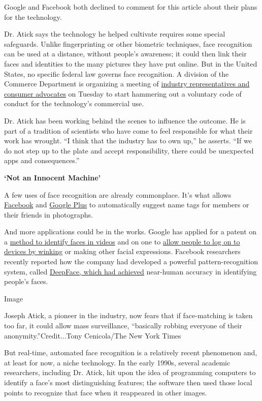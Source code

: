 Google and Facebook both declined to comment for this article about
their plans for the technology.

Dr. Atick says the technology he helped cultivate requires some special
safeguards. Unlike fingerprinting or other biometric techniques, face
recognition can be used at a distance, without people's awareness; it
could then link their faces and identities to the many pictures they
have put online. But in the United States, no specific federal law
governs face recognition. A division of the Commerce Department is
organizing a meeting of
\href{http://www.nytimes3xbfgragh.onion/2014/02/02/technology/when-no-one-is-just-a-face-in-the-crowd.html}{industry
representatives and consumer advocates} on Tuesday to start hammering
out a voluntary code of conduct for the technology's commercial use.

Dr. Atick has been working behind the scenes to influence the outcome.
He is part of a tradition of scientists who have come to feel
responsible for what their work has wrought. ``I think that the industry
has to own up,'' he asserts. ``If we do not step up to the plate and
accept responsibility, there could be unexpected apps and
consequences.''

\textbf{`Not an Innocent Machine'}

A few uses of face recognition are already commonplace. It's what allows
\href{https://www.facebookcorewwwi.onion/help/122175507864081}{Facebook}
and \href{https://support.google.com/plus/answer/2370300?hl=en}{Google
Plus} to automatically suggest name tags for members or their friends in
photographs.

And more applications could be in the works. Google has applied for a
patent on a \href{http://1.usa.gov/1dxTzys}{method to identify faces in
videos} and on one to \href{http://1.usa.gov/1lq4JCw}{allow people to
log on to devices by winking} or making other facial expressions.
Facebook researchers recently reported how the company had developed a
powerful pattern-recognition system, called
\href{https://www.facebookcorewwwi.onion/publications/546316888800776/}{DeepFace,
which had achieved} near-human accuracy in identifying people's faces.

Image

Joseph Atick, a pioneer in the industry, now fears that if face-matching
is taken too far, it could allow mass surveillance, ``basically robbing
everyone of their anonymity.''Credit...Tony Cenicola/The New York Times

But real-time, automated face recognition is a relatively recent
phenomenon and, at least for now, a niche technology. In the early
1990s, several academic researchers, including Dr. Atick, hit upon the
idea of programming computers to identify a face's most distinguishing
features; the software then used those local points to recognize that
face when it reappeared in other images.

